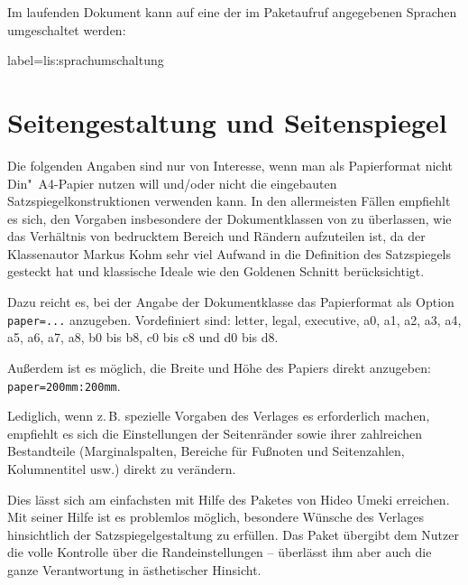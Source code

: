 
Im laufenden Dokument kann auf eine der im Paketaufruf angegebenen Sprachen umgeschaltet werden:

\begin{lfgwcode}{label={lis:sprachumschaltung}}
\end{lfgwcode}


%


\section{Seitengestaltung und Seitenspiegel}
\label{komaskript}
 

Die folgenden Angaben sind nur von Interesse, wenn man als Papierformat nicht Din"~A4-Papier 
nutzen will und/oder nicht die eingebauten Satzspiegelkonstruktionen verwenden kann.
In den allermeisten Fällen empfiehlt es sich, den Vorgaben insbesondere der Dokumentklassen von
\KOMAScript{} zu überlassen, wie das Verhältnis von bedrucktem Bereich und Rändern aufzuteilen ist,
da der Klassenautor Markus Kohm sehr viel Aufwand in die Definition des Satzspiegels gesteckt hat und
klassische Ideale wie den Goldenen Schnitt berücksichtigt.

Dazu reicht es, bei der Angabe der Dokumentklasse das Papierformat als Option \lstinline/paper=.../ anzugeben.
Vordefiniert sind: letter, legal, executive, a0, a1, a2, a3, a4, a5, a6, a7, a8, b0 bis b8, c0 bis c8 und
d0 bis d8. 

Außerdem ist es möglich, die Breite und Höhe des Papiers direkt anzugeben:
\lstinline/paper=200mm:200mm/.

Lediglich, wenn z.\,B. spezielle Vorgaben des Verlages es erforderlich machen, empfiehlt es sich
die Einstellungen der Seitenränder sowie ihrer zahlreichen Bestandteile (Marginalspalten, Bereiche
für Fußnoten und Seitenzahlen, Kolumnentitel usw.) direkt zu verändern.
 


Dies lässt sich am einfachsten mit Hilfe des Paketes  von Hideo Umeki erreichen.
Mit seiner Hilfe ist es problemlos möglich, besondere Wünsche des Verlages hinsichtlich der Satzspiegelgestaltung zu erfüllen. Das Paket übergibt dem Nutzer die volle Kontrolle über die
Randeinstellungen -- überlässt ihm aber auch die ganze Verantwortung in ästhetischer Hinsicht.

